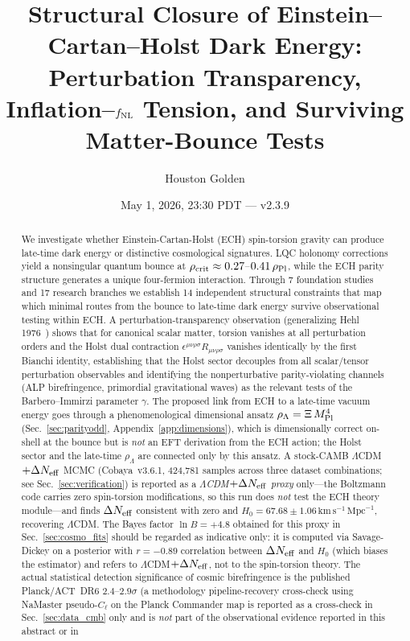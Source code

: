 \documentclass[aps,prd,twocolumn,superscriptaddress,showpacs,preprintnumbers,nofootinbib,longbibliography,floatfix]{revtex4-2}
\newcommand{\Neff}{N_{\rm eff}}
\newcommand{\paperVersion}{v2.3.9}
\begin{document}

\title{Structural Closure of Einstein--Cartan--Holst Dark Energy:\\
Perturbation Transparency, Inflation--$f_{\rm NL}$ Tension, and Surviving Matter-Bounce Tests}

\author{Houston Golden}

\date{May 1, 2026, 23:30 PDT --- \paperVersion}

\begin{abstract}
We investigate whether Einstein-Cartan-Holst (ECH) spin-torsion gravity can produce late-time dark energy or distinctive cosmological signatures. LQC holonomy corrections yield a nonsingular quantum bounce at $\rho_{\rm crit} \approx 0.27$--$0.41\,\rho_{\rm Pl}$, while the ECH parity structure generates a unique four-fermion interaction. Through 7 foundation studies and 17 research branches we establish 14 independent structural constraints that map which minimal routes from the bounce to late-time dark energy survive observational testing within ECH. A perturbation-transparency observation (generalizing Hehl 1976~\cite{Hehl1976}) shows that for canonical scalar matter, torsion vanishes at all perturbation orders and the Holst dual contraction $\epsilon^{\mu\nu\rho\sigma}R_{\mu\nu\rho\sigma}$ vanishes identically by the first Bianchi identity, establishing that the Holst sector decouples from all scalar/tensor perturbation observables and identifying the nonperturbative parity-violating channels (ALP birefringence, primordial gravitational waves) as the relevant tests of the Barbero--Immirzi parameter $\gamma$. The proposed link from ECH to a late-time vacuum energy goes through a phenomenological dimensional ansatz $\rho_\Lambda = \Xi\,M_{\rm Pl}^4$ (Sec.~\ref{sec:parityodd}, Appendix~\ref{app:dimensions}), which is dimensionally correct on-shell at the bounce but is \emph{not} an EFT derivation from the ECH action; the Holst sector and the late-time $\rho_\Lambda$ are connected only by this ansatz. A stock-CAMB $\Lambda$CDM$+\Delta\Neff$ MCMC (Cobaya~v3.6.1, 424{,}781 samples across three dataset combinations; see Sec.~\ref{sec:verification}) is reported as a \emph{$\Lambda$CDM$+\Delta\Neff$ proxy} only---the Boltzmann code carries zero spin-torsion modifications, so this run does \emph{not} test the ECH theory module---and finds $\Delta\Neff$ consistent with zero and $H_0 = 67.68\pm 1.06\,\text{km}\,\text{s}^{-1}\,\text{Mpc}^{-1}$, recovering $\Lambda$CDM. The Bayes factor $\ln B = +4.8$ obtained for this proxy in Sec.~\ref{sec:cosmo_fits} should be regarded as indicative only: it is computed via Savage-Dickey on a posterior with $r=-0.89$ correlation between $\Delta\Neff$ and $H_0$ (which biases the estimator) and refers to $\Lambda$CDM$+\Delta\Neff$, not to the spin-torsion theory. The actual statistical detection significance of cosmic birefringence is the published Planck/ACT~DR6 $2.4$--$2.9\sigma$ (a methodology pipeline-recovery cross-check using NaMaster pseudo-$C_\ell$ on the Planck Commander map is reported as a cross-check in Sec.~\ref{sec:data_cmb} only and is \emph{not} part of the observational evidence reported in this abstract or in 
\end{abstract}
\end{document}
